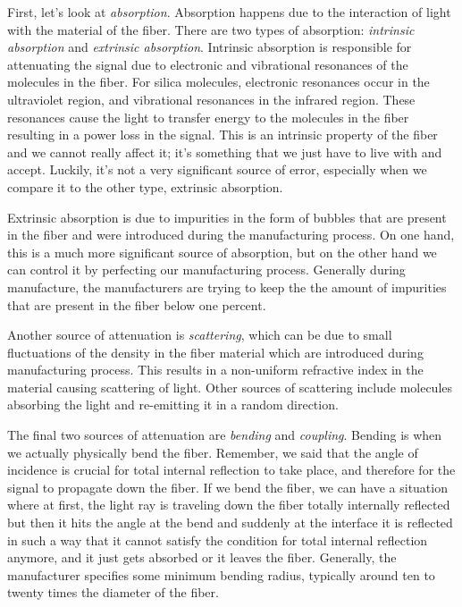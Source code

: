 First, let's look at \emph{absorption}.
Absorption happens due to the interaction of light with the material of the fiber. There are two types of absorption: \emph{intrinsic absorption} and \emph{extrinsic absorption}. Intrinsic absorption is responsible for attenuating the signal due to electronic and vibrational resonances of the molecules in the fiber. For silica molecules, electronic resonances occur in the ultraviolet region, and vibrational resonances in the infrared region. These resonances cause the light to transfer energy to the molecules in the fiber resulting in a power loss in the signal. This is an intrinsic property of the fiber and we cannot really affect it; it's something that we just have to live with and accept. Luckily, it's not a very significant source of error, especially when we compare it to the other type, extrinsic absorption.

Extrinsic absorption is due to impurities in the form of bubbles that are present in the fiber and were introduced during the manufacturing process. On one hand, this is a much more significant source of absorption, but on the other hand we can control it by perfecting our manufacturing process. Generally during manufacture, the manufacturers are trying to keep the the amount of impurities that are present in the fiber below one percent.

Another source of attenuation is \emph{scattering}, which can be due to small fluctuations of the density in the fiber material which are introduced during manufacturing process.
This results in a non-uniform refractive index in the material causing scattering of light.
Other sources of scattering include molecules absorbing the light and re-emitting it in a random direction.

The final two sources of attenuation are \emph{bending} and \emph{coupling}. Bending is when we actually physically bend the fiber. Remember, we said that the angle of incidence is crucial for total internal reflection to take place, and therefore for the signal to propagate down the fiber. If we bend the fiber, we can have a situation where at first, the light ray is traveling down the fiber totally internally reflected but then it hits the angle at the bend and suddenly at the interface it is reflected in such a way that it cannot satisfy the condition for total internal reflection anymore, and it just gets absorbed or it leaves the fiber.  Generally, the manufacturer specifies some minimum bending radius, typically around ten to twenty times the diameter of the fiber.

